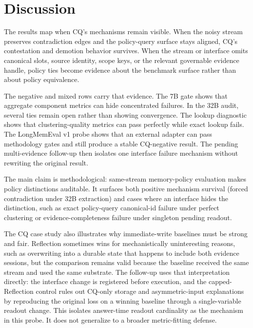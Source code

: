 \section{Discussion}

The results map when CQ's mechanisms remain visible. When the noisy stream
preserves contradiction edges and the policy-query surface stays aligned, CQ's
contestation and demotion behavior survives. When the stream or interface omits
canonical slots, source identity, scope keys, or the relevant
governable evidence handle, policy ties become evidence about the benchmark
surface rather than about policy equivalence.

The negative and mixed rows carry that evidence. The 7B gate shows that
aggregate component metrics can hide concentrated failures. In the 32B audit,
several ties remain open rather than showing convergence. The lookup diagnostic
shows that clustering-quality metrics can pass perfectly while exact lookup
fails. The LongMemEval v1
probe shows that an external adapter can pass methodology
gates and still produce a stable CQ-negative result. The pending multi-evidence
follow-up then isolates one interface failure mechanism without rewriting the
original result.

The main claim is methodological: same-stream memory-policy evaluation makes
policy distinctions auditable. It surfaces both positive mechanism survival
(forced contradiction under 32B extraction) and cases where an interface hides
the distinction, such as exact policy-query canonical-id failure under perfect
clustering or evidence-completeness failure under singleton pending readout.

The CQ case study also illustrates why immediate-write baselines must be strong
and fair. Reflection sometimes wins for mechanistically uninteresting reasons,
such as overwriting into a durable state that happens to include both evidence
sessions, but the comparison remains valid because the baseline received the
same stream and used the same substrate. The follow-up uses that interpretation
directly: the interface change is registered before execution, and the
capped-Reflection control rules out CQ-only storage and asymmetric-input
explanations by reproducing the original loss on a winning baseline through a
single-variable readout change. This isolates answer-time readout cardinality
as the mechanism in this probe. It does not generalize to a broader
metric-fitting defense.
